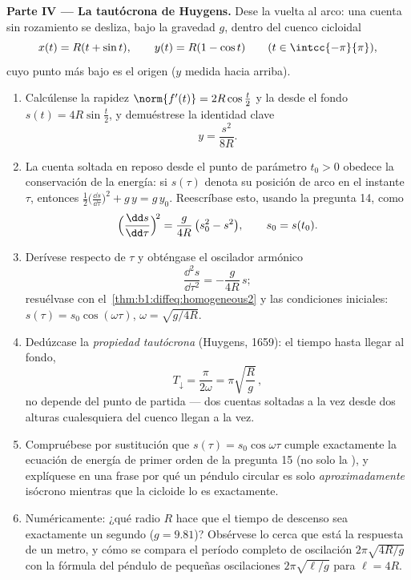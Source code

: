 \begin{problem}
\medskip
\noindent\textbf{Parte IV --- La tautócrona de Huygens.} Dese la
vuelta al arco: una cuenta sin rozamiento se desliza, bajo la
gravedad $g$, dentro del cuenco cicloidal
\[
x(t) = R(t + \sin t), \qquad y(t) = R(1 - \cos t)
\qquad (t \in \intcc{-\pi}{\pi}),
\]
cuyo punto más bajo es el origen ($y$ medida hacia arriba).
\begin{enumerate}[resume]
  \item Calcúlense la rapidez $\norm{f'(t)} = 2R\cos\frac t2$ y la
         desde el fondo $s(t) = 4R\sin\frac t2$, y
        demuéstrese la identidad clave
        \[
        y = \frac{s^2}{8R} .
        \]
  \item La cuenta soltada en reposo desde el punto de parámetro
        $t_0 > 0$ obedece la conservación de la energía: si
        $s(\tau)$ denota su posición de arco en el instante $\tau$,
        entonces
        $\frac12\bigl( \frac{\dd s}{\dd\tau}\bigr)^2 + g\,y = g\,y_0$.
        Reescríbase esto, usando la pregunta 14, como
        \[
        \Bigl(\frac{\dd s}{\dd\tau}\Bigr)^{\!2}
        = \frac{g}{4R}\,\bigl(s_0^2 - s^2\bigr),
        \qquad s_0 = s(t_0).
        \]
  \item Derívese respecto de $\tau$ y obténgase el oscilador
        armónico
        \[
        \frac{\dd^2 s}{\dd\tau^2} = -\frac{g}{4R}\,s ;
        \]
        resuélvase con el~\cref{thm:b1:diffeq:homogeneous2} y las
        condiciones iniciales: $s(\tau) = s_0\cos(\omega\tau)$,
        $\omega = \sqrt{g/4R}$.
  \item Dedúzcase la \emph{propiedad tautócrona} (Huygens, 1659):
        el tiempo hasta llegar al fondo,
        \[
        T_{\downarrow} = \frac{\pi}{2\omega}
        = \pi\sqrt{\frac Rg}\,,
        \]
        no depende del punto de partida --- dos cuentas soltadas a
        la vez desde dos alturas cualesquiera del cuenco llegan a la
        vez.
  \item Compruébese por sustitución que
        $s(\tau) = s_0\cos\omega\tau$ cumple exactamente la ecuación
        de energía de primer orden de la pregunta 15 (no solo la
        ), y explíquese en una frase por qué un péndulo
        circular es solo \emph{aproximadamente} isócrono mientras
        que la cicloide lo es exactamente.
  \item Numéricamente: ¿qué radio $R$ hace que el tiempo de
        descenso sea exactamente un segundo ($g = 9.81$)?
        Obsérvese lo cerca que está la respuesta de un metro, y
        cómo se compara el período completo de oscilación
        $2\pi\sqrt{4R/g}$ con la fórmula del péndulo de pequeñas
        oscilaciones $2\pi\sqrt{\ell/g}$ para $\ell = 4R$.
\end{enumerate}


\end{problem}
